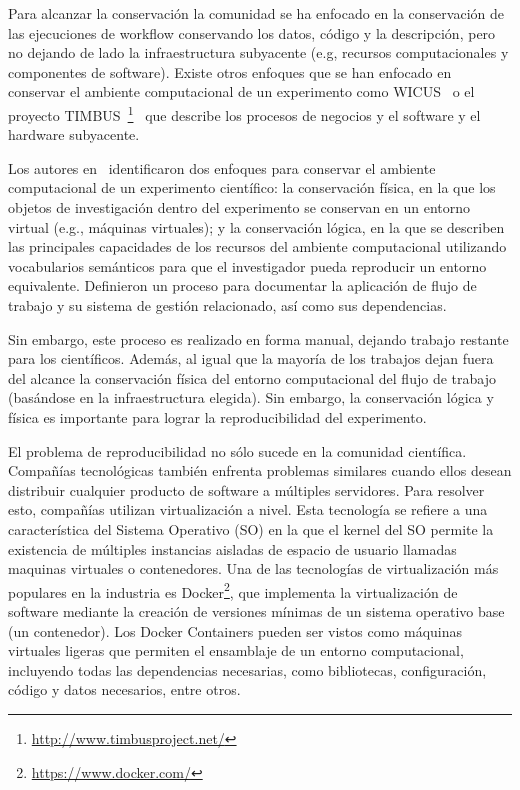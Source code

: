 Para alcanzar la conservación la comunidad se ha enfocado en la conservación de las ejecuciones de workflow conservando los datos, código y la descripción,  pero no dejando de lado la infraestructura subyacente (e.g, recursos computacionales y componentes de software).
Existe otros enfoques que se han enfocado en conservar el ambiente computacional de un experimento como WICUS~\cite{santana2017reproducibility} o el proyecto TIMBUS~\footnote{\url{http://www.timbusproject.net/}}~\cite{dappert2013describing} que describe los procesos de negocios y el software y el hardware subyacente.


Los autores en~\cite{santana2017reproducibility} identificaron dos enfoques para conservar el ambiente computacional de un experimento científico: la conservación física, en la que los objetos de investigación dentro del experimento se conservan en un entorno virtual (e.g., máquinas virtuales); y la conservación lógica, en la que se describen las principales capacidades de los recursos del ambiente computacional utilizando vocabularios semánticos para que el investigador pueda reproducir un entorno equivalente. Definieron un proceso para documentar la aplicación de flujo de trabajo y su sistema de gestión relacionado, así como sus dependencias. 

Sin embargo, este proceso es realizado en forma manual, dejando trabajo restante para los científicos. Además, al igual que la mayoría de los trabajos dejan fuera del alcance la conservación física del entorno computacional del flujo de trabajo (basándose en la infraestructura elegida). Sin embargo, la conservación lógica y física es importante para lograr la reproducibilidad del experimento. 

El problema de reproducibilidad no sólo sucede en la comunidad científica. Compañías tecnológicas también enfrenta problemas similares cuando ellos desean distribuir cualquier producto de software a múltiples servidores.
Para resolver esto, compañías utilizan virtualización a nivel. Esta tecnología se refiere a una característica del Sistema Operativo (SO) en la que el kernel del SO permite la existencia de múltiples instancias aisladas de espacio de usuario llamadas maquinas virtuales o contenedores. 
Una de las tecnologías de virtualización más populares en la industria es Docker\footnote{\url{https://www.docker.com/}}, que implementa la virtualización de software mediante la creación de versiones mínimas de un sistema operativo base (un contenedor).
Los Docker Containers pueden ser vistos como máquinas virtuales ligeras que permiten el ensamblaje de un entorno computacional, incluyendo todas las dependencias necesarias, como bibliotecas, configuración, código y datos necesarios, entre otros. 


